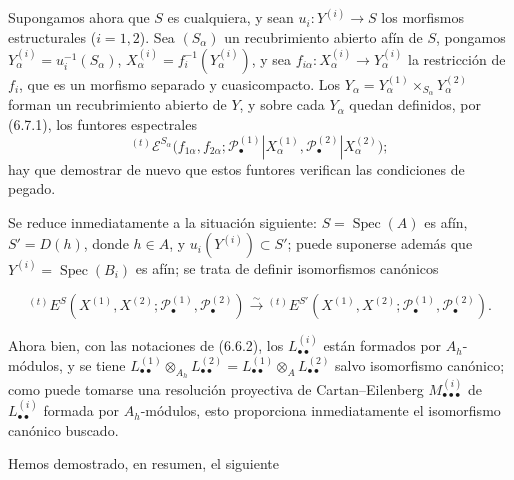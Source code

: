 \begin{env}[6.7.2]
\label{III.6.7.2}
Supongamos ahora que $S$ es cualquiera, y sean
$u_i:Y^{(i)}\to S$ los morfismos estructurales ($i=1,2$). Sea $(S_\alpha)$ un
recubrimiento abierto afín de $S$, pongamos
$Y_\alpha^{(i)}=u_i^{-1}(S_\alpha)$,
$X_\alpha^{(i)}=f_i^{-1}(Y_\alpha^{(i)})$, y sea
$f_{i\alpha}:X_\alpha^{(i)}\to Y_\alpha^{(i)}$ la restricción de $f_i$, que
es un morfismo separado y cuasicompacto. Los
$Y_\alpha=Y_\alpha^{(1)}\times_{S_\alpha}Y_\alpha^{(2)}$ forman un
recubrimiento abierto de $Y$, y sobre cada $Y_\alpha$ quedan definidos, por
(6.7.1), los funtores espectrales
\[
  {}^{(t)}\mathscr E^{S_\alpha}
  \bigl(f_{1\alpha},f_{2\alpha};
    \mathscr P_\bullet^{(1)}|X_\alpha^{(1)},
    \mathscr P_\bullet^{(2)}|X_\alpha^{(2)}\bigr);
\]
hay que demostrar de nuevo que estos funtores verifican las condiciones de
pegado.

Se reduce inmediatamente a la situación siguiente:
$S=\operatorname{Spec}(A)$ es afín, $S'=D(h)$, donde $h\in A$, y
$u_i(Y^{(i)})\subset S'$; puede suponerse además que
$Y^{(i)}=\operatorname{Spec}(B_i)$ es afín; se trata de definir isomorfismos
canónicos

\label{III.6.7.2.1}
\[
  {}^{(t)}E^S
  (X^{(1)},X^{(2)};
   \mathscr P_\bullet^{(1)},\mathscr P_\bullet^{(2)})
  \xrightarrow{\sim}
  {}^{(t)}E^{S'}
  (X^{(1)},X^{(2)};
   \mathscr P_\bullet^{(1)},\mathscr P_\bullet^{(2)}).
  \tag{6.7.2.1}\label{III.6.7.2.1.fr}
\]

Ahora bien, con las notaciones de (6.6.2), los
$L_{\bullet\bullet}^{(i)}$ están formados por $A_h$-módulos, y se tiene
$L_{\bullet\bullet}^{(1)}\otimes_{A_h}L_{\bullet\bullet}^{(2)}
=L_{\bullet\bullet}^{(1)}\otimes_A L_{\bullet\bullet}^{(2)}$ salvo
isomorfismo canónico; como puede tomarse una resolución proyectiva de
Cartan--Eilenberg $M_{\bullet\bullet\bullet}^{(i)}$ de
$L_{\bullet\bullet}^{(i)}$ formada por $A_h$-módulos, esto proporciona
inmediatamente el isomorfismo canónico buscado.
\end{env}

Hemos demostrado, en resumen, el siguiente

